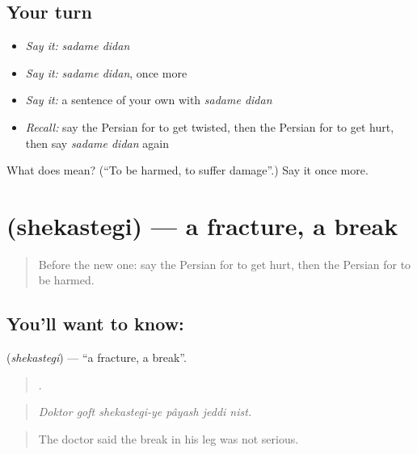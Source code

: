 \subsection*{Your turn}
\begin{itemize}
\raggedright
  \item \emph{Say it:} \emph{sadame didan}
  \item \emph{Say it:} \emph{sadame didan}, once more
  \item \emph{Say it:} a sentence of your own with \emph{sadame didan}
  \item \emph{Recall:} say the Persian for to get twisted, then the Persian for to get hurt, then say \emph{sadame didan} again
\end{itemize}

\begin{tcolorbox}[breakable,colback=teal!4,colframe=teal!35!black,title={Before you move on}]
What does   mean? (\textquotedblleft{}To be harmed, to suffer damage\textquotedblright{}.) Say it once more.
\end{tcolorbox}
\section[\texorpdfstring{\fa{شکستگی} (shekastegi)}{شکستگی (shekastegi)}]{ (shekastegi) — a fracture, a break}

\label{lesson:FA-C325-shekastegi}



\begin{quote}
Before the new one: say the Persian for to get hurt, then the Persian for to be harmed.
\end{quote}

\subsection*{You'll want to know: }
\textbf{} (\emph{shekastegi}) — \textquotedblleft{}a fracture, a break\textquotedblright{}.

\begin{quote}
     .
\end{quote}

\begin{quote}
\emph{Doktor goft shekastegi-ye pâyash jeddi nist.}
\end{quote}

\begin{quote}
The doctor said the break in his leg was not serious.
\end{quote}

